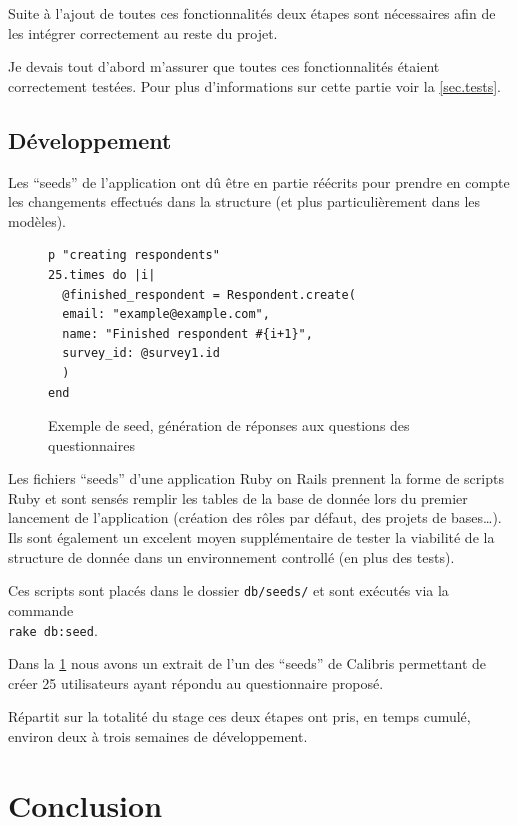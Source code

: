 \documentclass[12pt,a4paper]{book}
\begin{document}
Suite à l'ajout de toutes ces fonctionnalités deux étapes sont nécessaires afin de les intégrer correctement au reste du projet.

Je devais tout d'abord m'assurer que toutes ces fonctionnalités étaient correctement testées. Pour plus d'informations sur cette partie voir la \cref{sec.tests}.

\subsection{Développement}

Les ``seeds'' de l'application ont dû être en partie réécrits pour prendre en compte les changements effectués dans la structure (et plus particulièrement dans les modèles).

  \begin{figure}[h]
  \lstset{language=ruby}
  \begin{lstlisting}
p "creating respondents"
25.times do |i|
  @finished_respondent = Respondent.create(
  email: "example@example.com",
  name: "Finished respondent #{i+1}",
  survey_id: @survey1.id
  )
end
  \end{lstlisting}
   \caption{Exemple de seed, génération de réponses aux questions des questionnaires}
  \label{fig.seeds}
  \end{figure}

Les fichiers ``seeds'' d'une application Ruby on Rails prennent la forme de scripts Ruby et sont sensés remplir les tables de la base de donnée lors du premier lancement de l'application (création des rôles par défaut, des projets de bases…). Ils sont également un excelent moyen supplémentaire de tester la viabilité de la structure de donnée dans un environnement controllé (en plus des tests).

Ces scripts sont placés dans le dossier \texttt{db/seeds/} et sont exécutés via la commande \\
\texttt{rake db:seed}.

Dans la \cref{fig.seeds} nous avons un extrait de l'un des ``seeds'' de Calibris permettant de créer 25 utilisateurs ayant répondu au questionnaire proposé. 

Répartit sur la totalité du stage ces deux étapes ont pris, en temps cumulé, environ deux à trois semaines de développement.

\section*{Conclusion}
\end{document}
